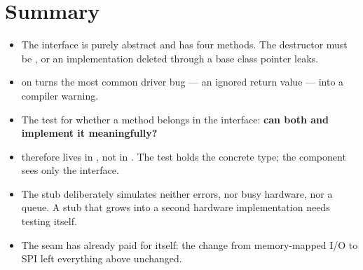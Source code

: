 \section*{Summary}

\begin{itemize}
  \item The interface is purely abstract and has four methods. The destructor must be
    , or an implementation deleted through a base class pointer leaks.
  \item \code{[[nodiscard]]} on  turns the most common driver bug --- an ignored
    return value --- into a compiler warning.
  \item The test for whether a method belongs in the interface: \textbf{can both  and
     implement it meaningfully?}
  \item {} therefore lives in , not in . The test holds
    the concrete type; the component sees only the interface.
  \item The stub deliberately simulates neither errors, nor busy hardware, nor a queue. A stub
    that grows into a second hardware implementation needs testing itself.
  \item The seam has already paid for itself: the change from memory-mapped I/O to SPI left
    everything above  unchanged.
\end{itemize}
